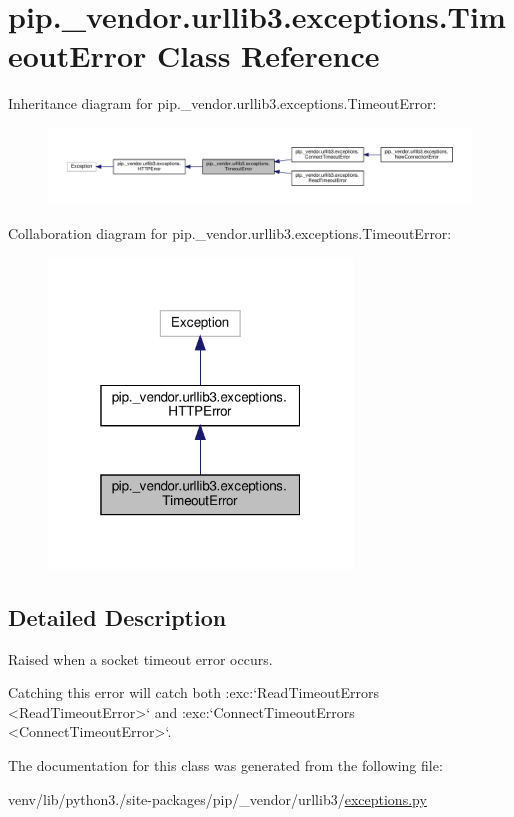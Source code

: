 \hypertarget{classpip_1_1__vendor_1_1urllib3_1_1exceptions_1_1TimeoutError}{}\section{pip.\+\_\+vendor.\+urllib3.\+exceptions.\+Timeout\+Error Class Reference}
\label{classpip_1_1__vendor_1_1urllib3_1_1exceptions_1_1TimeoutError}


Inheritance diagram for pip.\+\_\+vendor.\+urllib3.\+exceptions.\+Timeout\+Error\+:
\nopagebreak
\begin{figure}[H]
\begin{center}
\leavevmode
\includegraphics[width=350pt]{classpip_1_1__vendor_1_1urllib3_1_1exceptions_1_1TimeoutError__inherit__graph}
\end{center}
\end{figure}


Collaboration diagram for pip.\+\_\+vendor.\+urllib3.\+exceptions.\+Timeout\+Error\+:
\nopagebreak
\begin{figure}[H]
\begin{center}
\leavevmode
\includegraphics[width=229pt]{classpip_1_1__vendor_1_1urllib3_1_1exceptions_1_1TimeoutError__coll__graph}
\end{center}
\end{figure}


\subsection{Detailed Description}
\begin{DoxyVerb}Raised when a socket timeout error occurs.

Catching this error will catch both :exc:`ReadTimeoutErrors
<ReadTimeoutError>` and :exc:`ConnectTimeoutErrors <ConnectTimeoutError>`.
\end{DoxyVerb}
 

The documentation for this class was generated from the following file\+:\begin{DoxyCompactItemize}
\item 
venv/lib/python3./site-\/packages/pip/\+\_\+vendor/urllib3/\hyperlink{pip_2__vendor_2urllib3_2exceptions_8py}{exceptions.\+py}\end{DoxyCompactItemize}
